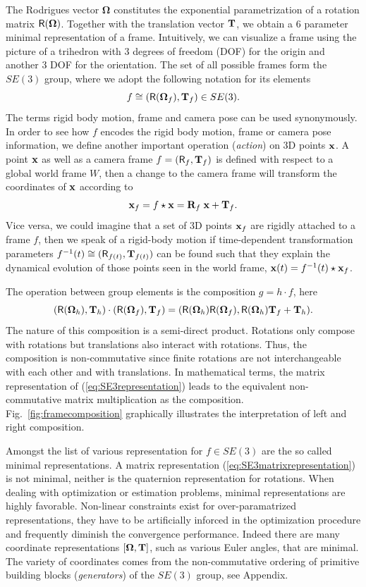 \documentclass[conference]{IEEEtran}
\newcommand{\bfOmega}{\boldsymbol{\Omega}}
\newcommand{\beq}{\begin{equation}}
\newcommand{\eeq}{\end{equation}}
\begin{document}
The Rodrigues vector $\bfOmega$ constitutes the exponential parametrization of a rotation matrix ${\sf R}(\bfOmega)$.
Together with the translation vector ${\bf T}$, we obtain a 6 parameter minimal representation of a frame. Intuitively, we can visualize a frame using the picture of a trihedron with 3 degrees of freedom (DOF)
for the origin and another 3 DOF for the orientation. The set of all possible frames form the $SE(3)$ group, where we adopt the following notation for its elements
\beq
    f \cong ({\sf R}(\bfOmega_f),{\bf T}_f) \in SE(3).
    \label{eq:SE3representation}
\eeq
The terms rigid body motion, frame and camera pose can be used synonymously.
In order to see how $f$ encodes the rigid body motion, frame or camera pose information,
we define another important operation ({\em action}) on 3D points ${\bf x}$.
A point ${\bf x}$ as well as a camera frame $f = ({\sf R}_f,{\bf T}_f)$ is defined with
respect to a global world frame $W$, then
a change to the camera frame will transform the coordinates of ${\bf x}$ according to
\beq
    {\bf x}_{f} = f\star {\bf x} = {\bf R}_{f}\; {\bf x} + {\bf T}_{f}. \label{eq:SE3action}
\eeq
Vice versa, we could imagine that a set of 3D points ${\bf x}_{f}$ are rigidly attached to a frame $f$,
then we speak of a rigid-body motion if time-dependent transformation parameters $f^{-1}(t)\cong({\sf R}_{f(t)},{\bf T}_{f(t)})$ can be found such that they explain the dynamical evolution of those points seen in the world frame,
${\bf x}(t) = f^{-1}(t)\star {\bf x}_f$.

The operation between group elements is the composition $g=h\cdot f$, here
\beq
    ({\sf R}(\bfOmega_h),{\bf T}_h)\cdot ({\sf R}(\bfOmega_f),{\bf T}_f) =
    ({\sf R}(\bfOmega_h){\sf R}(\bfOmega_f), {\sf R}(\bfOmega_h) {\bf T}_f + {\bf T}_h).
    \label{eq:groupcomposition}
\eeq
The nature of this composition is a semi-direct product. Rotations only compose with
rotations but translations also interact with rotations. Thus, the composition is non-commutative
since finite rotations are not interchangeable with each other and with translations. In mathematical terms, the matrix
representation of (\ref{eq:SE3representation}) leads to the equivalent non-commutative matrix
multiplication as the composition. Fig.~\ref{fig:framecomposition}
graphically illustrates the interpretation of left and right composition.

Amongst the list of various representation for $f\in SE(3)$ are the so called minimal
representations. A matrix representation (\ref{eq:SE3matrixrepresentation}) is not minimal, neither is
the quaternion representation for rotations. When dealing with optimization or estimation problems,
minimal representations are highly favorable. Non-linear constraints exist for over-paramatrized
representations, they have to be artificially inforced in the optimization procedure and frequently
diminish the convergence performance.
Indeed there are many coordinate representations $[\bfOmega,{\bf T}]$, such as various Euler angles, that are
minimal. The variety of coordinates comes from the non-commutative ordering of
primitive building blocks ({\em generators}) of the $SE(3)$ group, see Appendix.
\end{document}
